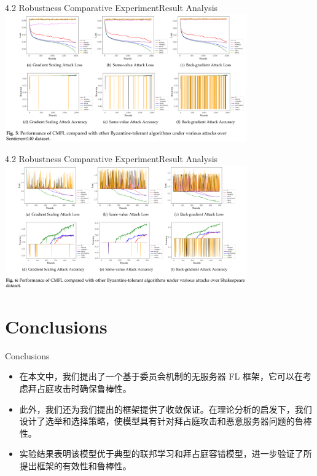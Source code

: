\documentclass{sintefbeamer}
\theoremstyle{definition}
\begin{document}
\begin{frame}{4.2 Robustness Comparative Experiment}{Result Analysis}
	\includegraphics[width=0.78\textwidth]{images/exp_fig5}
\end{frame}

\begin{frame}{4.2 Robustness Comparative Experiment}{Result Analysis}
	\includegraphics[width=0.78\textwidth]{images/exp_fig6}
\end{frame}

\section{Conclusions}

\begin{frame}{Conclusions}


\begin{itemize}
    \item 在本文中，我们提出了一个基于委员会机制的无服务器 FL 框架，它可以在考虑拜占庭攻击时确保鲁棒性。
    \item 此外，我们还为我们提出的框架提供了收敛保证。在理论分析的启发下，我们设计了选举和选择策略，使模型具有针对拜占庭攻击和恶意服务器问题的鲁棒性。
    \item 实验结果表明该模型优于典型的联邦学习和拜占庭容错模型，进一步验证了所提出框架的有效性和鲁棒性。
  \end{itemize}
\end{frame}



\backmatter
\end{document}
